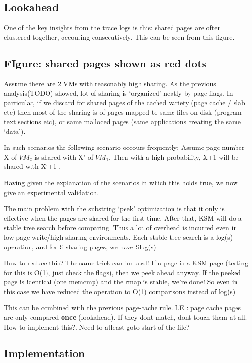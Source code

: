 \documentclass[10pt,a4paper]{article}
\begin{document}
\subsection{Lookahead}
One of the key insights from the trace logs is this: shared pages are often clustered together, occouring consecutively. 
This can be seen from this figure.
\subsection{FIgure: shared pages shown as red dots }
Assume there are 2 VMs with reasonably high sharing. As the previous analysis(TODO) showed, lot of sharing is `organized' neatly by page flags. In particular, if we discard for shared pages of the cached variety (page cache / slab etc) then most of the sharing is of pages mapped to same files on disk (program text sections etc), or same malloced pages (same applications creating the same `data'). 

In such scenarios the following scenario occours frequently:
Assume page number X of $VM_2$ is shared with X' of $VM_1$, Then with a high probability, X+1 will be shared with X`+1 .

Having given the explanation of the scenarios in which this holds true, we now give an experimental validation.

The main problem with the substring `peek' optimization is that it only is effective when the pages are shared for the first time. After that, KSM will do a stable tree search before comparing. 
Thus a lot of overhead is incurred even in low page-write/high sharing environments. Each stable tree search is a log(s) operation, and for S sharing pages, we have Slog(s). 

How to reduce this? The same trick can be used! If a page is a KSM page (testing for this is O(1), just check the flags), then we peek ahead anyway. If the peeked page is identical (one memcmp) and the rmap is stable, we're done! So even in this case we have reduced the operation to O(1) comparisons instead of log(s).

This can be combined with the previous page-cache rule.
I.E : page cache pages are only compared \textbf{once} (lookahead). If they dont match, dont touch them at all. 
How to implement this?. Need to atleast goto start of the file?

\subsection{Implementation}
\end{document}
